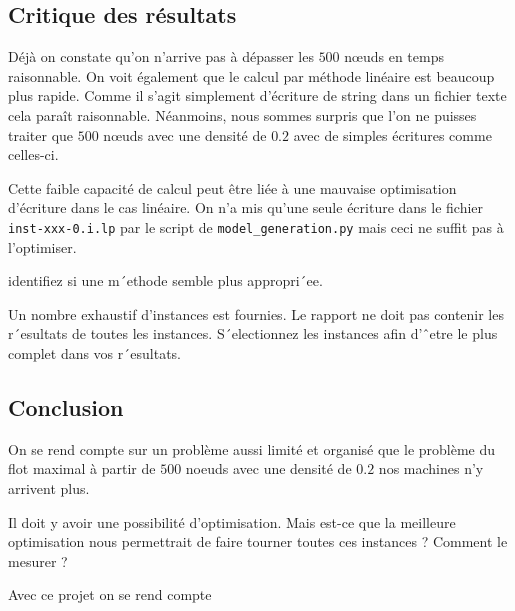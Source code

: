 \documentclass{article}[12pt]
\begin{document}
\subsection{Critique des résultats}

Déjà on constate qu'on n'arrive pas à dépasser les $500$ nœuds en temps raisonnable. 
On voit également que le calcul par méthode linéaire est beaucoup plus rapide. 
Comme il s'agit simplement d'écriture de string dans un fichier texte cela paraît raisonnable. Néanmoins, nous sommes surpris que l'on ne puisses traiter que $500$ nœuds avec une densité de $0.2$ avec de simples écritures comme celles-ci.

Cette faible capacité de calcul peut être liée à une mauvaise optimisation d'écriture dans le cas linéaire. 
On n'a mis qu'une seule écriture dans le fichier \texttt{inst-xxx-0.i.lp} par le script de \texttt{model\_generation.py} mais ceci ne suffit pas à l'optimiser. 



   identifiez si une m´ethode semble plus
appropri´ee.

Un nombre exhaustif d’instances est fournies. Le rapport ne doit pas contenir les r´esultats de toutes
les instances. S´electionnez les instances afin d’ˆetre le plus complet dans vos r´esultats.






    \newpage

    \subsection{Conclusion}
    
    On se rend compte sur un problème aussi limité et organisé que le problème du flot maximal à partir de $500$ noeuds avec une densité de $0.2$  nos machines n'y arrivent plus.
    
    Il doit y avoir une possibilité d'optimisation. Mais est-ce que la meilleure optimisation nous permettrait de faire tourner toutes ces instances ? Comment le mesurer ? 
    
    Avec ce projet on se rend compte 


    \newpage
    
    
\begin{thebibliography}{99}





    


\end{thebibliography}


    

    
\end{document}
